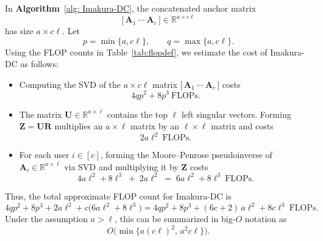 \documentclass[final,3p,times]{elsarticle}
\theoremstyle{plain}
\newcommand{\matr}[1]{\bm{#1}}        %
\begin{document}
In \textbf{Algorithm}~\ref{alg: Imakura-DC}, the concatenated anchor matrix
\begin{equation}
\bigl[\,\matr{A}_1~\cdots~\matr{A}_c\,\bigr] \in \mathbb{R}^{a \times c\ell}
\end{equation}
has size $a \times c\ell$. Let
\begin{equation}
p = \min\{a, c\ell\},\qquad q = \max\{a, c\ell\}.
\end{equation}
Using the FLOP counts in Table~\ref{tab:flopdef}, we estimate the cost of
Imakura-DC as follows:
\begin{itemize}
  \item Computing the SVD of the $a \times c\ell$ matrix
        $\bigl[\,\matr{A}_1~\cdots~\matr{A}_c\,\bigr]$ costs
        \begin{equation}
        4 q p^{2} + 8 p^{3} \ \text{FLOPs}.
        \end{equation}
  \item The matrix $\matr{U} \in \mathbb{R}^{a \times \ell}$ contains the top
        $\ell$ left singular vectors. Forming
        $\matr{Z} = \matr{U}\matr{R}$ multiplies an $a \times \ell$ matrix by
        an $\ell \times \ell$ matrix and costs
        \begin{equation}
        2 a \ell^{2} \ \text{FLOPs}.
        \end{equation}
  \item For each user $i \in [c]$, forming the Moore--Penrose pseudoinverse
        of $\matr{A}_i \in \mathbb{R}^{a \times \ell}$ via SVD and multiplying
        it by $\matr{Z}$ costs
        \begin{equation}
        4 a \ell^{2} + 8 \ell^{3} \;+\; 2 a \ell^{2}
        \;=\; 6 a \ell^{2} + 8 \ell^{3} \ \text{FLOPs}.
        \end{equation}
\end{itemize}
Thus, the total approximate FLOP count for Imakura-DC is
\begin{equation}
\label{eq:imakura-flops}
4 q p^{2} + 8 p^{3}
   + 2 a \ell^{2}
   + c\bigl(6 a \ell^{2} + 8 \ell^{3}\bigr) 
= 4 q p^{2} + 8 p^{3}
   + (6c + 2)\,a \ell^{2}
   + 8 c \ell^{3} \ \text{FLOPs}.
\end{equation}
Under the assumption $a > \ell$, this can be summarized in big-$O$ notation as
\begin{equation}
O\bigl(\min\{a(c\ell)^{2},\, a^{2}c\ell\}\bigr).
\end{equation}
\end{document}
